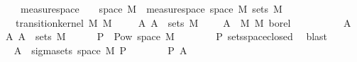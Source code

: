 \begin{isabellebody}
\ \ \ \ measure{\isacharunderscore}{\kern0pt}space{\isacharcolon}{\kern0pt}\ {\isachardoublequoteopen}{\isasymAnd}{\isasymomega}{\isachardot}{\kern0pt}\ {\isasymomega}\ {\isasymin}\ space\ M\ {\isasymLongrightarrow}\ measure{\isacharunderscore}{\kern0pt}space\ {\isacharparenleft}{\kern0pt}space\ M{\isacharprime}{\kern0pt}{\isacharparenright}{\kern0pt}\ {\isacharparenleft}{\kern0pt}sets\ M{\isacharprime}{\kern0pt}{\isacharparenright}{\kern0pt}\ {\isacharparenleft}{\kern0pt}{\isasymkappa}\ {\isasymomega}{\isacharparenright}{\kern0pt}{\isachardoublequoteclose}\isanewline
\ \ \ {\isachardoublequoteopen}transition{\isacharunderscore}{\kern0pt}kernel\ M\ M{\isacharprime}{\kern0pt}\ {\isasymkappa}{\isachardoublequoteclose}\isanewline
%
\isadelimproof
%
\endisadelimproof
%
\isatagproof
{}\isamarkupfalse%
\isanewline
\ \ \isamarkupfalse%
\ {\isachardoublequoteopen}{\isasymAnd}A{\isacharprime}{\kern0pt}{\isachardot}{\kern0pt}\ A{\isacharprime}{\kern0pt}\ {\isasymin}\ sets\ M{\isacharprime}{\kern0pt}\ {\isasymLongrightarrow}\ {\isacharparenleft}{\kern0pt}{\isasymlambda}{\isasymomega}{\isachardot}{\kern0pt}\ {\isasymkappa}\ {\isasymomega}\ A{\isacharprime}{\kern0pt}{\isacharparenright}{\kern0pt}\ {\isasymin}\ M\ {\isasymrightarrow}\isactrlsub M\ borel{\isachardoublequoteclose}\isanewline
\ \ \isamarkupfalse%
\ {\isacharminus}{\kern0pt}\isanewline
\ \ \ \ \isamarkupfalse%
\ A{\isacharprime}{\kern0pt}\ \isamarkupfalse%
\ A{\isacharprime}{\kern0pt}{\isacharcolon}{\kern0pt}\ {\isachardoublequoteopen}A{\isacharprime}{\kern0pt}\ {\isasymin}\ sets\ M{\isacharprime}{\kern0pt}{\isachardoublequoteclose}\isanewline
\ \ \ \ \isamarkupfalse%
\ {\isachardoublequoteopen}P\ {\isasymsubseteq}\ Pow\ {\isacharparenleft}{\kern0pt}space\ M{\isacharprime}{\kern0pt}{\isacharparenright}{\kern0pt}{\isachardoublequoteclose}\isanewline
\ \ \ \ \ \ \isamarkupfalse%
\ P{\isacharparenleft}{\kern0pt}{}{\isacharparenright}{\kern0pt}\ sets{\isachardot}{\kern0pt}space{\isacharunderscore}{\kern0pt}closed\ \isamarkupfalse%
\ blast\isanewline
\ \ \ \ \isamarkupfalse%
\ \isamarkupfalse%
\ {\isachardoublequoteopen}A{\isacharprime}{\kern0pt}\ {\isasymin}\ sigma{\isacharunderscore}{\kern0pt}sets\ {\isacharparenleft}{\kern0pt}space\ M{\isacharprime}{\kern0pt}{\isacharparenright}{\kern0pt}\ P{\isachardoublequoteclose}\isanewline
\ \ \ \ \ \ \isamarkupfalse%
\ P{\isacharparenleft}{\kern0pt}{}{\isacharparenright}{\kern0pt}\ A{\isacharprime}{\kern0pt}\ \isamarkupfalse%

\end{isabellebody}
